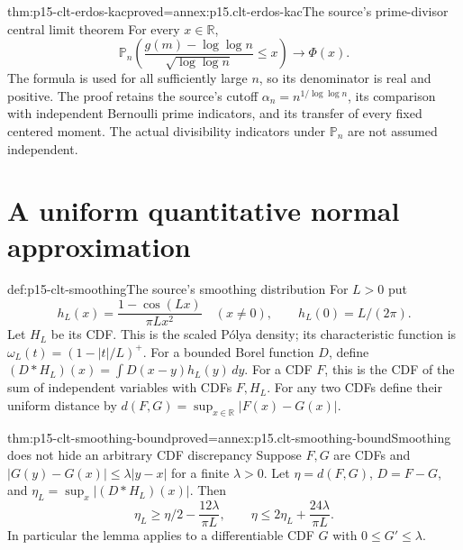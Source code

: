 \begin{hbtheorem}{thm:p15-clt-erdos-kac}{proved=annex:p15.clt-erdos-kac}{The source's prime-divisor central limit theorem}
For every \(x\in\mathbb R\),
\[
 \mathbb P_n\left(
   \frac{g(m)-\log\log n}{\sqrt{\log\log n}}\leq x\right)
                      \longrightarrow\Phi(x).
 \]
The formula is used for all sufficiently large \(n\), so its
denominator is real and positive. The proof retains the source's
cutoff \(\alpha_n=n^{1/\log\log n}\), its comparison with
independent Bernoulli prime indicators, and its transfer of
every fixed centered moment. The actual divisibility indicators
under \(\mathbb P_n\) are not assumed independent.
\end{hbtheorem}

\section{A uniform quantitative normal approximation}
\label{sec:p15-clt-berry-esseen}

\begin{hbdefinition}{def:p15-clt-smoothing}{The source's smoothing distribution}
For \(L>0\) put
\[
 h_L(x)=\frac{1-\cos(Lx)}{\pi Lx^2}\quad(x\ne0),
 \qquad h_L(0)=L/(2\pi).
 \]
Let \(H_L\) be its CDF. This is the scaled Pólya density;
its characteristic function is
\(\omega_L(t)=(1-|t|/L)^+\).
For a bounded Borel function \(D\), define
\((D*H_L)(x)=\int D(x-y)h_L(y)\,dy\).
For a CDF \(F\), this is the CDF of the sum of independent
variables with CDFs \(F,H_L\).
For any two CDFs define their uniform distance by
\(d(F,G)=\sup_{x\in\mathbb R}|F(x)-G(x)|\).
\end{hbdefinition}

\begin{hblemma}{thm:p15-clt-smoothing-bound}{proved=annex:p15.clt-smoothing-bound}{Smoothing does not hide an arbitrary CDF discrepancy}
Suppose \(F,G\) are CDFs and
\(|G(y)-G(x)|\leq\lambda|y-x|\) for a finite
\(\lambda>0\). Let
\(\eta=d(F,G)\), \(D=F-G\), and
\(\eta_L=\sup_x|(D*H_L)(x)|\). Then
\[
 \eta_L\geq\eta/2-\frac{12\lambda}{\pi L},
 \qquad
 \eta\leq2\eta_L+\frac{24\lambda}{\pi L}.
 \]
In particular the lemma applies to a differentiable CDF \(G\)
with \(0\leq G'\leq\lambda\).
\end{hblemma}

